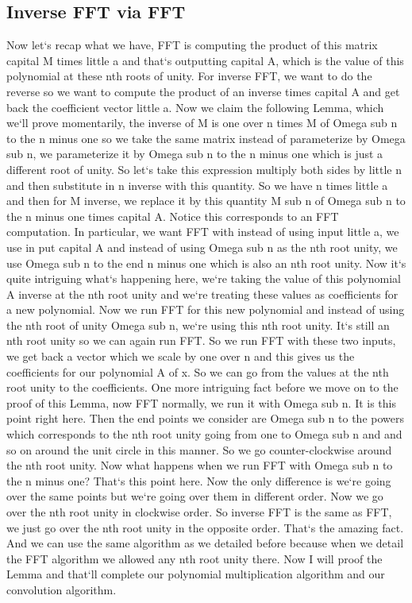 \subsection{Inverse FFT via FFT}
Now let`s recap what we have, FFT is computing the product of this matrix capital M times little a and that`s outputting capital A, which is the value of this polynomial at these nth roots of unity.
For inverse FFT, we want to do the reverse so we want to compute the product of an inverse times capital A and get back the coefficient vector little a.
Now we claim the following Lemma, which we`ll prove momentarily, the inverse of M is one over n times M of Omega sub n to the n minus one so we take the same matrix instead of parameterize by Omega sub n, we parameterize it by Omega sub n to the n minus one which is just a different root of unity.
So let`s take this expression multiply both sides by little n and then substitute in n inverse with this quantity.
So we have n times little a and then for M inverse, we replace it by this quantity M sub n of Omega sub n to the n minus one times capital A\@.
Notice this corresponds to an FFT computation.
In particular, we want FFT with instead of using input little a, we use in put capital A and instead of using Omega sub n as the nth root unity, we use Omega sub n to the end n minus one which is also an nth root unity.
Now it`s quite intriguing what`s happening here, we`re taking the value of this polynomial A inverse at the nth root unity and we`re treating these values as coefficients for a new polynomial.
Now we run FFT for this new polynomial and instead of using the nth root of unity Omega sub n, we`re using this nth root unity.
It`s still an nth root unity so we can again run FFT\@.
So we run FFT with these two inputs, we get back a vector which we scale by one over n and this gives us the coefficients for our polynomial A of x.
So we can go from the values at the nth root unity to the coefficients.
One more intriguing fact before we move on to the proof of this Lemma, now FFT normally, we run it with Omega sub n.
It is this point right here.
Then the end points we consider are Omega sub n to the powers which corresponds to the nth root unity going from one to Omega sub n and and so on around the unit circle in this manner.
So we go counter-clockwise around the nth root unity.
Now what happens when we run FFT with Omega sub n to the n minus one? That`s this point here.
Now the only difference is we`re going over the same points but we`re going over them in different order.
Now we go over the nth root unity in clockwise order.
So inverse FFT is the same as FFT, we just go over the nth root unity in the opposite order.
That`s the amazing fact.
And we can use the same algorithm as we detailed before because when we detail the FFT algorithm we allowed any nth root unity there.
Now I will proof the Lemma and that`ll complete our polynomial multiplication algorithm and our convolution algorithm.

